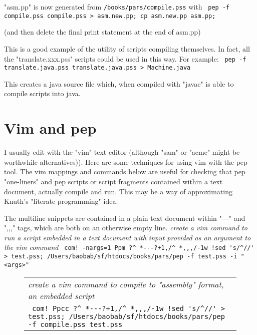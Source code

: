 \documentclass[a4paper,12pt]{article}
\begin{document}
  "asm.pp" is now generated from \texttt{/books/pars/compile.pss} with 
 \verb| pep -f compile.pss compile.pss > asm.new.pp; cp asm.new.pp asm.pp; |

  (and then delete the final print statement at the end of asm.pp)

  This is a good example of the utility of scripts compiling themselves.
  In fact, all the "translate.xxx.pss" scripts could be used in this way.
  For example: 
 \verb| pep -f translate.java.pss translate.java.pss > Machine.java |


  This creates a java source file which, when compiled with "javac"
  is able to compile scripts into java.

\section{Vim and pep}

  I usually edit with the "vim" text editor (although "sam" or "acme" might
  be worthwhile alternatives)). Here are some techniques for using vim with
  the pep tool. The vim mappings and commands below are useful for checking
  that pep "one-liners" and pep scripts or script fragments contained within a
  text document, actually compile and run. This may be a way of approximating
  Knuth's "literate programming" idea.

  The multiline snippets are contained in a plain text document within "---"
  and ",,," tags, which are both on an otherwise empty line.
 \emph{ create a vim command to run a script embedded in a text document }
 \emph{ with input provided as an argument to the vim command } 
 \verb| com! -nargs=1 Ppm ?^ *---?+1,/^ *,,,/-1w !sed 's/^//' > test.pss; /Users/baobab/sf/htdocs/books/pars/pep -f test.pss -i "<args>" |

 \begin{figure}
 \begin{tabular}{ l }
 \emph{ create a vim command to compile to "assembly" format, an embedded script  } \\ 
 \verb| com! Ppcc ?^ *---?+1,/^ *,,,/-1w !sed 's/^//' > test.pss; /Users/baobab/sf/htdocs/books/pars/pep -f compile.pss test.pss  |
 \end{tabular} 
 \end{figure}
\end{document}
